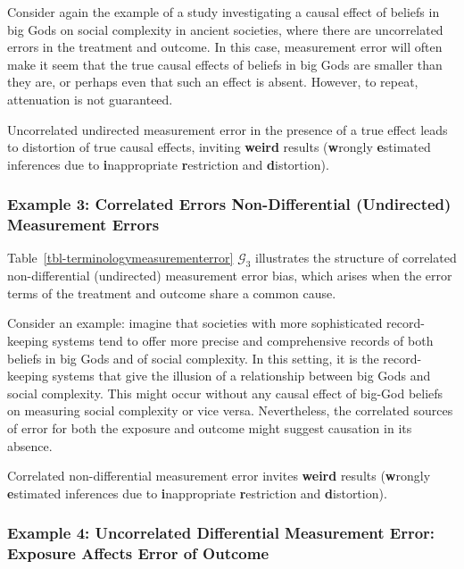 \documentclass[
  single column]{article}
\begin{document}
Consider again the example of a study investigating a causal effect of
beliefs in big Gods on social complexity in ancient societies, where
there are uncorrelated errors in the treatment and outcome. In this
case, measurement error will often make it seem that the true causal
effects of beliefs in big Gods are smaller than they are, or perhaps
even that such an effect is absent. However, to repeat, attenuation is
not guaranteed.

Uncorrelated undirected measurement error in the presence of a true
effect leads to distortion of true causal effects, inviting
\textbf{weird} results (\textbf{w}rongly \textbf{e}stimated inferences
due to \textbf{i}nappropriate \textbf{r}estriction and
\textbf{d}istortion).

\subsubsection{Example 3: Correlated Errors Non-Differential
(Undirected) Measurement
Errors}\label{example-3-correlated-errors-non-differential-undirected-measurement-errors}

Table~\ref{tbl-terminologymeasurementerror} \(\mathcal{G}_3\)
illustrates the structure of correlated non-differential (undirected)
measurement error bias, which arises when the error terms of the
treatment and outcome share a common cause.

Consider an example: imagine that societies with more sophisticated
record-keeping systems tend to offer more precise and comprehensive
records of both beliefs in big Gods and of social complexity. In this
setting, it is the record-keeping systems that give the illusion of a
relationship between big Gods and social complexity. This might occur
without any causal effect of big-God beliefs on measuring social
complexity or vice versa. Nevertheless, the correlated sources of error
for both the exposure and outcome might suggest causation in its
absence.

Correlated non-differential measurement error invites \textbf{weird}
results (\textbf{w}rongly \textbf{e}stimated inferences due to
\textbf{i}nappropriate \textbf{r}estriction and \textbf{d}istortion).

\subsubsection{Example 4: Uncorrelated Differential Measurement Error:
Exposure Affects Error of
Outcome}\label{example-4-uncorrelated-differential-measurement-error-exposure-affects-error-of-outcome}
\end{document}
